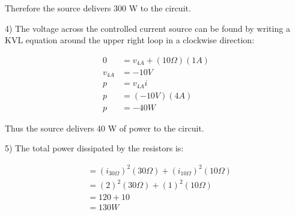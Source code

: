 Therefore the source delivers 300 W to the circuit. 

4) The voltage across the controlled current source can be found by writing a KVL equation
around the upper right loop in a clockwise direction:

\begin{align*}
	0 &= v_{4A} + (10\Omega)(1A) \\
	v_{4A} &= -10 V \\
	p &= v_{4A}i \\
	p &= (-10 V)(4 A) \\
	p &= -40 W
\end{align*}

Thus the source delivers 40 W of power to the circuit. 

5) The total power dissipated by the resistors is:

\begin{align*}
	&= (i_{30\Omega})^2(30\Omega) + (i_{10\Omega})^2(10\Omega) \\
	&= (2)^2(30\Omega)+(1)^2(10\Omega) \\
	&= 120 + 10 \\
	&= 130 W \\
\end{align*}


